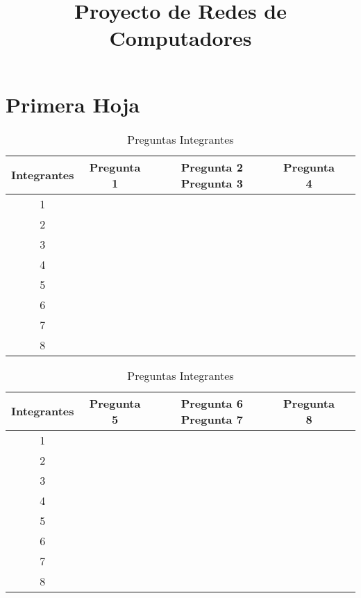 \documentclass[]{article}
\title{Proyecto de Redes de Computadores}
\author{}
\begin{document}
\maketitle
\newpage

\section{Primera Hoja}
\begin{table}[h!]
  \begin{center}
    \caption{Preguntas Integrantes}
    \begin{tabular}{ccccc}
      \toprule
      \textbf{Integrantes} & \textbf{Pregunta 1} & \textbf{Pregunta 2}
      \textbf{Pregunta 3} & \textbf{Pregunta 4} \\
      \midrule
      1 &  &  \\
      2 &  &  \\
      3 &  &  \\
      4 &  &  \\
      5 &  &  \\
      6 &  &  \\
      7 &  &  \\
      8 &  &  \\
      \bottomrule
    \end{tabular}
  \end{center}
\end{table}

\begin{table}[h!]
  \begin{center}
    \caption{Preguntas Integrantes}
    \begin{tabular}{ccccc}
      \toprule
      \textbf{Integrantes} & \textbf{Pregunta 5} & \textbf{Pregunta 6}
      \textbf{Pregunta 7} & \textbf{Pregunta 8} \\
      \midrule
      1 &  &  \\
      2 &  &  \\
      3 &  &  \\
      4 &  &  \\
      5 &  &  \\
      6 &  &  \\
      7 &  &  \\
      8 &  &  \\
      \bottomrule
    \end{tabular}
  \end{center}
\end{table}
\end{document}
